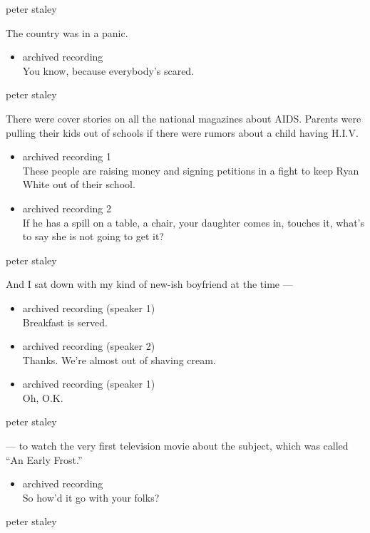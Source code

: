 peter staley

The country was in a panic.

\begin{itemize}
\tightlist
\item
  archived recording\\
  You know, because everybody's scared.
\end{itemize}

peter staley

There were cover stories on all the national magazines about AIDS.
Parents were pulling their kids out of schools if there were rumors
about a child having H.I.V.

\begin{itemize}
\item
  archived recording 1\\
  These people are raising money and signing petitions in a fight to
  keep Ryan White out of their school.
\item
  archived recording 2\\
  If he has a spill on a table, a chair, your daughter comes in, touches
  it, what's to say she is not going to get it?
\end{itemize}

peter staley

And I sat down with my kind of new-ish boyfriend at the time ---

\begin{itemize}
\item
  archived recording (speaker 1)\\
  Breakfast is served.
\item
  archived recording (speaker 2)\\
  Thanks. We're almost out of shaving cream.
\item
  archived recording (speaker 1)\\
  Oh, O.K.
\end{itemize}

peter staley

--- to watch the very first television movie about the subject, which
was called ``An Early Frost.''

\begin{itemize}
\tightlist
\item
  archived recording\\
  So how'd it go with your folks?
\end{itemize}

peter staley

